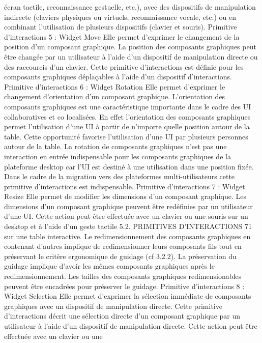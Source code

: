 \documentclass{article}
\begin{document}
\'{e}cran tactile, reconnaissance gestuelle, etc.), avec des dispositifs de manipulation indirecte (claviers
physiques ou virtuels, reconnaissance vocale, etc.) ou en combinant l’utilisation de plusieurs dispositifs (clavier et souris).
Primitive d’interactions 5 : Widget Move
Elle permet d’exprimer le changement de la position d’un composant graphique.
La position des composants graphiques peut \^{e}tre chang\'{e}e par un utilisateur \`{a} l’aide d’un dispositif de
manipulation directe ou des raccourcis d’un clavier. Cette primitive d’interactions est d\'{e}ﬁnie pour les
composants graphiques d\'{e}pla\c{c}ables \`{a} l’aide d’un dispositif d’interactions.
Primitive d’interactions 6 : Widget Rotation
Elle permet d’exprimer le changement d’orientation d’un composant graphique.
L’orientation des composants graphiques est une caract\'{e}ristique importante dans le cadre des UI collaboratives et co localis\'{e}es. En effet l’orientation des composants graphiques permet l’utilisation d’une
UI \`{a} partir de n’importe quelle position autour de la table. Cette opportunit\'{e} favorise l’utilisation d’une
UI par plusieurs personnes autour de la table. La rotation de composants graphiques n’est pas une interaction en entr\'{e}e indispensable pour les composants graphiques de la plateforme desktop car l’UI
est destin\'{e} \`{a} une utilisation dans une position ﬁx\'{e}e. Dans le cadre de la migration vers des plateformes
multi-utilisateurs cette primitive d’interactions est indispensable.
Primitive d’interactions 7 : Widget Resize
Elle permet de modiﬁer les dimensions d’un composant graphique.
Les dimensions d’un composant graphique peuvent \^{e}tre red\'{e}ﬁnies par un utilisateur d’une UI. Cette
action peut \^{e}tre effectu\'{e}e avec un clavier ou une souris sur un desktop et \`{a} l’aide d’un geste tactile
5.2. PRIMITIVES D’INTERACTIONS
71
sur une table interactive. Le redimensionnement des composants graphiques en contenant d’autres
implique de redimensionner leurs composants ﬁls tout en pr\'{e}servant le crit\`{e}re ergonomique de guidage
(cf 3.2.2). La pr\'{e}servation du guidage implique d’avoir les m\^{e}mes composants graphiques apr\`{e}s le
redimensionnement. Les tailles des composants graphiques redimensionables peuvent \^{e}tre encadr\'{e}es
pour pr\'{e}server le guidage.
Primitive d’interactions 8 : Widget Selection
Elle permet d’exprimer la s\'{e}lection imm\'{e}diate de composants graphiques
avec un dispositif de manipulation directe.
Cette primitive d’interactions d\'{e}crit une s\'{e}lection directe d’un composant graphique par un utilisateur
\`{a} l’aide d’un dispositif de manipulation directe. Cette action peut \^{e}tre effectu\'{e}e avec un clavier ou une
\end{document}
